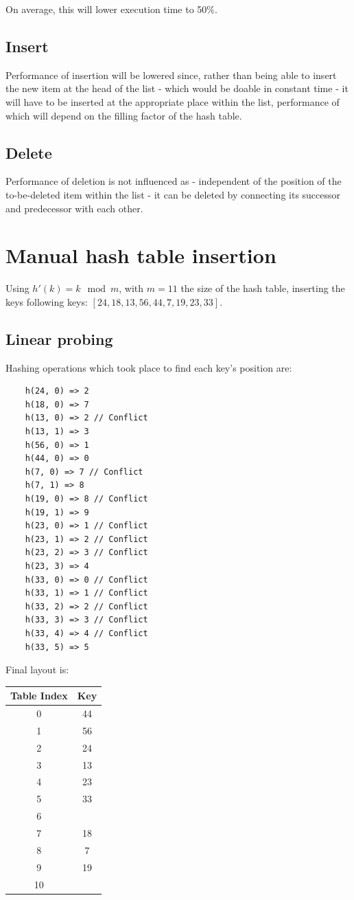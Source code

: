 \documentclass[a4paper]{scrartcl}
\begin{document}
On average, this will lower execution time to 50\%.

\subsection{Insert}

Performance of insertion will be lowered since, rather than being able to
insert the new item at the head of the list - which would be doable in constant
time - it will have to be inserted at the appropriate place within the list,
performance of which will depend on the filling factor of the hash table.

\subsection{Delete}

Performance of deletion is not influenced as - independent of the position of
the to-be-deleted item within the list - it can be deleted by connecting its
successor and predecessor with each other.

\section{Manual hash table insertion}

Using $h'(k) = k \mod m$, with $m = 11$ the size of the hash table, inserting
the keys following keys: $[24, 18, 13, 56, 44, 7, 19, 23, 33]$.

\subsection{Linear probing}

Hashing operations which took place to find each key's position are:

\begin{lstlisting}
	h(24, 0) => 2
	h(18, 0) => 7
	h(13, 0) => 2 // Conflict
	h(13, 1) => 3
	h(56, 0) => 1
	h(44, 0) => 0
	h(7, 0) => 7 // Conflict
	h(7, 1) => 8
	h(19, 0) => 8 // Conflict
	h(19, 1) => 9
	h(23, 0) => 1 // Conflict
	h(23, 1) => 2 // Conflict
	h(23, 2) => 3 // Conflict
	h(23, 3) => 4
	h(33, 0) => 0 // Conflict
	h(33, 1) => 1 // Conflict
	h(33, 2) => 2 // Conflict
	h(33, 3) => 3 // Conflict
	h(33, 4) => 4 // Conflict
	h(33, 5) => 5
\end{lstlisting}


Final layout is:

\begin{tabular}{|c|c|}
	\hline
	Table Index & Key \\
	\hline
	0 & 44 \\
	1 & 56 \\
	2 & 24 \\
	3 & 13 \\
	4 & 23 \\
	5 & 33 \\
	6 & \\
	7 & 18 \\
	8 & 7 \\
	9 & 19 \\
	10 & \\
	\hline
\end{tabular}
\end{document}
